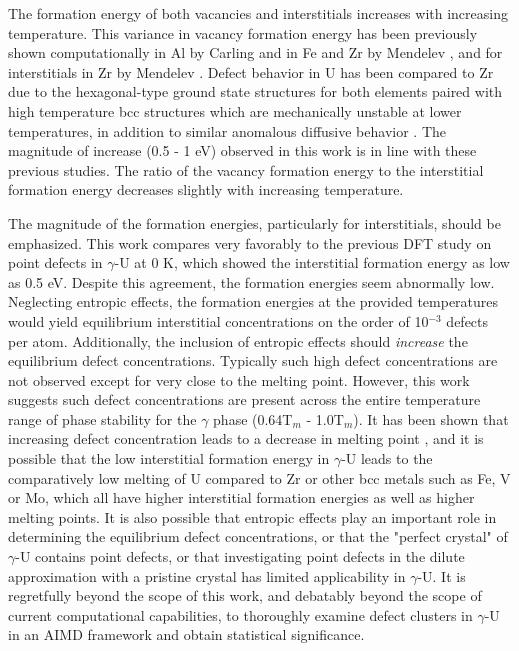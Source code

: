 \documentclass[review]{elsarticle}
\begin{document}
The formation energy of both vacancies and interstitials increases with increasing temperature. This variance in vacancy formation energy has been previously shown computationally in Al by Carling \cite{carling2003} and in Fe and Zr by Mendelev \cite{mendelev2009, mendelev2010}, and for interstitials in Zr by Mendelev \cite{mendelev2010}. Defect behavior in U has been compared to Zr due to the hexagonal-type ground state structures for both elements paired with high temperature bcc structures which are mechanically unstable at lower temperatures, in addition to similar anomalous diffusive behavior \cite{matter1980,kidson1961}. The magnitude of increase (0.5 - 1 eV) observed in this work is in line with these previous studies. The ratio of the vacancy formation energy to the interstitial formation energy decreases slightly with increasing temperature.

The magnitude of the formation energies, particularly for interstitials, should be emphasized. This work compares very favorably to the previous DFT study on point defects in $\gamma$-U at 0 K\cite{beeler2010}, which showed the interstitial formation energy as low as 0.5 eV. Despite this agreement, the formation energies seem abnormally low.  Neglecting entropic effects, the formation energies at the provided temperatures would yield equilibrium interstitial concentrations on the order of 10$^{-3}$ defects per atom. Additionally, the inclusion of entropic effects should \textit{increase} the equilibrium defect concentrations. Typically such high defect concentrations are not observed except for very close to the melting point. However, this work suggests such defect concentrations are present across the entire temperature range of phase stability for the $\gamma$ phase (0.64T$_m$ - 1.0T$_m$). It has been shown that increasing defect concentration leads to a decrease in melting point \cite{sorkin2003}, and it is possible that the low interstitial formation energy in $\gamma$-U leads to the comparatively low melting of U compared to Zr or other bcc metals \cite{williams1990} such as Fe, V or Mo, which all have higher interstitial formation energies \cite{mendelev2010, mendelev2009, nguyen2006} as well as higher melting points. It is also possible that entropic effects play an important role in determining the equilibrium defect concentrations, or that the "perfect crystal" of $\gamma$-U contains point defects, or that investigating point defects in the dilute approximation with a pristine crystal has limited applicability in $\gamma$-U. It is regretfully beyond the scope of this work, and debatably beyond the scope of current computational capabilities, to thoroughly examine defect clusters in $\gamma$-U in an AIMD framework and obtain statistical significance. 
\end{document}
